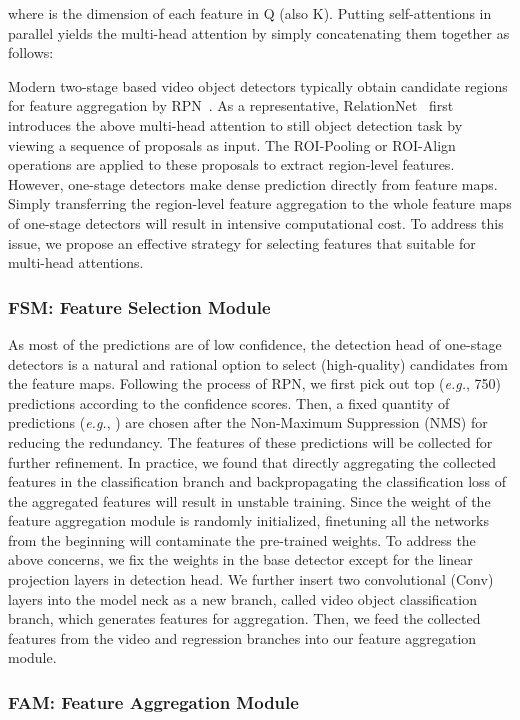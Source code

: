 \documentclass[letterpaper]{article} \usepackage{aaai23}  \usepackage{times}  \usepackage{helvet}  \usepackage{courier}  \usepackage[hyphens]{url}  \usepackage{graphicx} \urlstyle{rm} \def\UrlFont{\rm}  \usepackage{natbib}  \usepackage{caption} \usepackage{xcolor}
\begin{document}
where  is the dimension of each feature in Q (also K).
Putting  self-attentions in parallel yields the multi-head attention by simply concatenating them together as follows:

Modern two-stage based video object detectors typically obtain candidate regions for feature aggregation by RPN~\cite{ren2015faster}. As a representative, RelationNet~\cite{hu2018relation} first introduces the above multi-head attention to still object detection task by viewing a sequence of proposals as input. The ROI-Pooling or ROI-Align operations are applied to these proposals to extract region-level features. However, one-stage detectors make dense prediction directly from feature maps. Simply transferring the region-level feature aggregation to the whole feature maps of one-stage detectors will result in intensive computational cost. To address this issue, we propose an effective strategy for selecting features that suitable for multi-head attentions.


\subsubsection{FSM: Feature Selection Module}
As most of the predictions are of low confidence, the detection head of one-stage detectors is a natural and rational option to select (high-quality) candidates from the feature maps. Following the process of RPN, we first pick out top  (\emph{e.g.}, 750) predictions according to the confidence scores. Then, a fixed quantity  of predictions (\emph{e.g.}, ) are chosen after the Non-Maximum Suppression (NMS) for reducing the redundancy. The features of these predictions will be collected for further refinement. 
In practice, we found that directly aggregating the collected features in the classification branch and backpropagating the classification loss of the aggregated features will result in unstable training. Since the weight of the feature aggregation module is randomly initialized, finetuning all the networks from the beginning will contaminate the pre-trained weights. To address the above concerns, we fix the weights in the base detector except for the linear projection layers in detection head. We further insert two  convolutional (Conv) layers into the model neck as a new branch, called video object classification branch, which generates features for aggregation. Then, we feed the collected features from the video and regression branches into our feature aggregation module. 

\subsubsection{FAM: Feature Aggregation Module}
\end{document}
